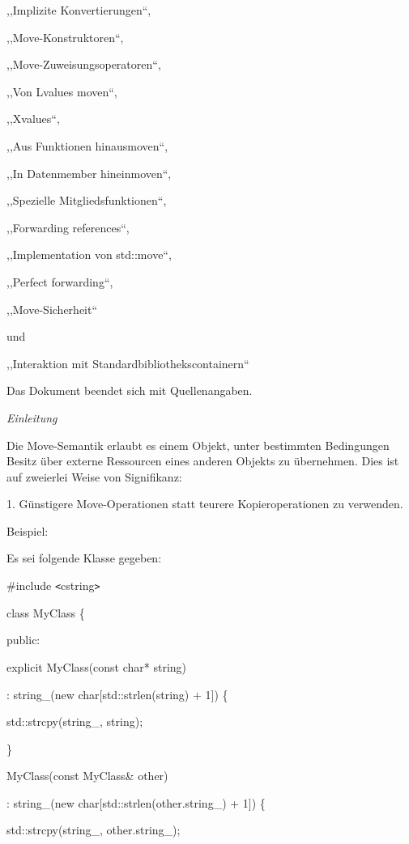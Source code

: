 \documentclass{article}
\begin{document}
,,Implizite Konvertierungen``,

,,Move-Konstruktoren``,

,,Move-Zuweisungsoperatoren``,

,,Von Lvalues moven``,

,,Xvalues``,

,,Aus Funktionen hinausmoven``,

,,In Datenmember hineinmoven``,

,,Spezielle Mitgliedsfunktionen``,

,,Forwarding references``,

,,Implementation von std::move``,

,,Perfect forwarding``,

,,Move-Sicherheit``

und

,,Interaktion mit Standardbibliothekscontainern``

Das Dokument beendet sich mit Quellenangaben.

\vspace{77pt}
\emph{Einleitung}

Die Move-Semantik erlaubt es einem Objekt, unter bestimmten Bedingungen Besitz 
über externe Ressourcen eines anderen Objekts zu übernehmen. Dies ist auf zweierlei 
Weise von Signifikanz:

1. Günstigere Move-Operationen statt teurere Kopieroperationen zu verwenden.

Beispiel:

Es sei folgende Klasse gegeben:

\vspace{12pt}
\#include \texttt{<}cstring\texttt{>}

\vspace{12pt}
class MyClass \{

public:    

\parindent=14pt
explicit MyClass(const char* string)        

\parindent=28pt
: string\_(new char[std::strlen(string) + 1]) \{        

std::strcpy(string\_, string);    

\parindent=43pt
\}    

\vspace{12pt}
\parindent=0pt
MyClass(const MyClass\& other)        

\parindent=28pt
: string\_(new char[std::strlen(other.string\_) + 1]) \{        

std::strcpy(string\_, other.string\_);    
\end{document}
